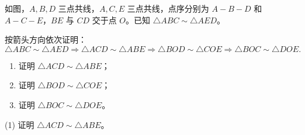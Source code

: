 \documentclass{exam-zh}
\begin{document}

\begin{eduProblemBlock}[模型例题]
\noindent
\begin{minipage}[t]{\dimexpr\linewidth-70mm-6mm\relax}
\vspace{0pt}
如图，$A,B,D$ 三点共线，$A,C,E$ 三点共线，点序分别为 $A-B-D$ 和 $A-C-E$，$BE$ 与 $CD$ 交于点 $O$。已知 $\triangle ABC\sim\triangle AED$。

按箭头方向依次证明：
\[
\triangle ABC\sim\triangle AED
\Longrightarrow
\triangle ACD\sim\triangle ABE
\Longrightarrow
\triangle BOD\sim\triangle COE
\Longrightarrow
\triangle BOC\sim\triangle DOE.
\]
\begin{enumerate}[label=(\arabic*)]
  \item 证明 $\triangle ACD\sim\triangle ABE$；
  \item 证明 $\triangle BOD\sim\triangle COE$；
  \item 证明 $\triangle BOC\sim\triangle DOE$。
\end{enumerate}

\end{minipage}\hfill
\begin{diagramcoltikz}{70mm}{先找 $A$ 处的共角，再找 $O$ 处的对顶角。}
}
\end{diagramcoltikz}
\end{eduProblemBlock}









\begin{eduSubQuestionItem}{(1)}
证明 $\triangle ACD\sim\triangle ABE$。\end{eduSubQuestionItem}
\end{document}
